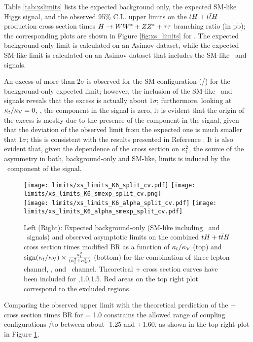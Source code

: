 Table \ref{tab:xslimits} lists the expected background only, the expected SM-like Higgs signal, and the observed 95\% C.L. upper limits on the $\tH+\ttH$ production cross section times $H \to WW^*+ZZ^*+\tau\tau$ branching ratio (in pb); the corresponding plots are shown in Figure \ref{fig:xs_limits} for . The expected background-only limit is calculated on an Asimov dataset, while the expected SM-like limit is calculated on an Asimov dataset that includes the SM-like \tH\ and \ttH signals.

An excess of more than $2\sigma$ is observed for the SM configuration (\Ct/) for the background-only expected limit; however, the inclusion of the SM-like \tH\ and \ttH signals reveals that the excess is actually about $1\sigma$; furthermore, looking at $\kappa_t/\kappa_\text{V}=0$, \ie, the \ttH component in the signal is zero, it is evident that the origin of the excess is mostly due to the presence of the \ttH component in the signal, given that the deviation of the observed limit from the expected one is much smaller that $1\sigma$; this is consistent with the results presented in Reference \cite{CMS_AN_2017-029}. It is also evident that, given the dependence of the \ttH cross section on $\kappa_t^2$, the source of the asymmetry in both, background-only and SM-like, limits is induced by the \tH\ component of the signal.     

\begin{figure} [!h]
 \centering
 \texttt{[image: limits/xs\_limits\_K6\_split\_cv.pdf]}
 \texttt{[image: limits/xs\_limits\_K6\_smexp\_split\_cv.png]}\\ 
 \texttt{[image: limits/xs\_limits\_K6\_alpha\_split\_cv.pdf]}
 \texttt{[image: limits/xs\_limits\_K6\_alpha\_smexp\_split\_cv.pdf]}    
\caption[Asymptotic limits on the combined $\tH+\ttH$ $\sigma\times$BR, ,1.0,1.5 .]{Left (Right): Expected background-only (SM-like including  \ttH\ and \tH\ signals) and observed asymptotic limits on the combined $\tH+\ttH$ cross section times modified BR as a function of $\kappa_t/\kappa_\text{V}$ (top) and $\mathrm{sign}(\kappa_t/\kappa_\text{V})\times\frac{\kappa_t^2}{(\kappa_t^2+\kappa_\text{V}^2)}$ (bottom) for the combination of three lepton channel, \mumu, and \emu\ channel. Theoretical \tH + \ttH cross section curves have been included for ,1.0,1.5. Red areas on the top right plot correspond to the excluded regions. }
\label{fig:xs_limits_cv}
\end{figure}

Comparing the observed upper limit with the theoretical prediction of the \tH + \ttH cross section times BR for \CV = 1.0 constrains the allowed range of coupling configurations \Ct/\CV to between about -1.25
and +1.60. as shown in the top right plot in Figure \ref{fig:xs_limits_cv}.

